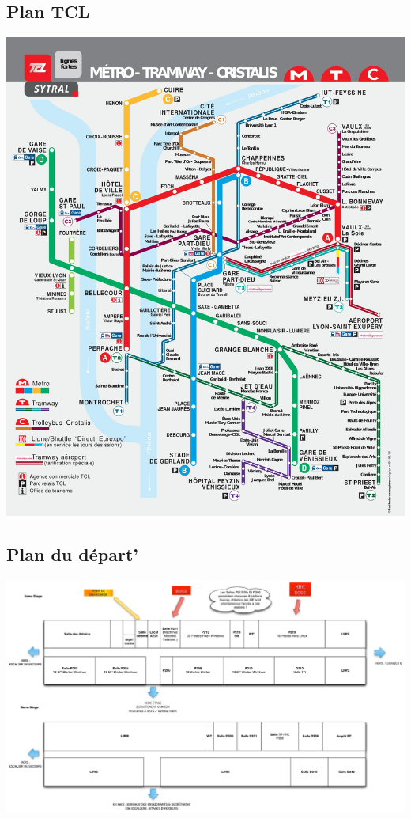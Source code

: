 \subsection{Plan TCL}
\hspace{-2cm}
\includegraphics[width=19cm]{images/planTCLFullRes.jpg}

\newpage 
\subsection{Plan du départ'}
\begin{center}
\includegraphics[width=24cm, angle=90]{images/planDepart.jpg}
\end{center}

